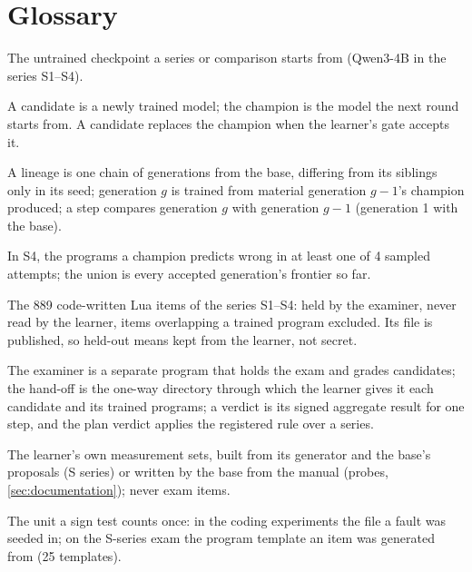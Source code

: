 
\section{Glossary}\label{app:glossary}

\begin{description}[leftmargin=2.2em, style=nextline, itemsep=2pt]
\item[base] The untrained checkpoint a series or comparison starts from (Qwen3-4B in the series S1--S4).
\item[candidate, champion] A candidate is a newly trained model; the champion is the model the next
  round starts from. A candidate replaces the champion when the learner's gate accepts it.
\item[lineage, generation, step] A lineage is one chain of generations from the base, differing from
  its siblings only in its seed; generation $g$ is trained from material generation $g-1$'s champion
  produced; a step compares generation $g$ with generation $g-1$ (generation 1 with the base).
\item[frontier, frontier union] In S4, the programs a champion predicts wrong in at least one of 4
  sampled attempts; the union is every accepted generation's frontier so far.
\item[held-out exam] The 889 code-written Lua items of the series S1--S4: held by the examiner, never read
  by the learner, items overlapping a trained program excluded. Its file is published, so held-out
  means kept from the learner, not secret.
\item[examiner, hand-off, verdict] The examiner is a separate program that holds the exam and grades
  candidates; the hand-off is the one-way directory through which the learner gives it each candidate
  and its trained programs; a verdict is its signed aggregate result for one step, and the plan
  verdict applies the registered rule over a series.
\item[dev set, retention set, probes] The learner's own measurement sets, built from its generator and
  the base's proposals (S series) or written by the base from the manual (probes, \cref{sec:documentation});
  never exam items.
\item[family] The unit a sign test counts once: in the coding experiments the file a fault was seeded
  in; on the S-series exam the program template an item was generated from (25 templates).

\end{description}
